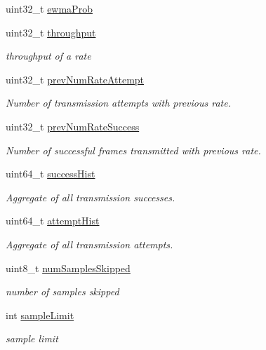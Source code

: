 \begin{DoxyCompactItemize}
uint32\+\_\+t \hyperlink{structns3_1_1RateInfo_a10c85a572d1d7abd171f4c3f377b6262}{ewma\+Prob}
\item 
uint32\+\_\+t \hyperlink{structns3_1_1RateInfo_acd9afc412f2d9c5573eb9bc3a00412b5}{throughput}
\begin{DoxyCompactList}\small\item\em throughput of a rate \end{DoxyCompactList}\item 
uint32\+\_\+t \hyperlink{structns3_1_1RateInfo_ad8211951a43c7f171155f54ec34d05e0}{prev\+Num\+Rate\+Attempt}
\begin{DoxyCompactList}\small\item\em Number of transmission attempts with previous rate. \end{DoxyCompactList}\item 
uint32\+\_\+t \hyperlink{structns3_1_1RateInfo_a76afd4eb7f46ff410b42f2b67d3afefc}{prev\+Num\+Rate\+Success}
\begin{DoxyCompactList}\small\item\em Number of successful frames transmitted with previous rate. \end{DoxyCompactList}\item 
uint64\+\_\+t \hyperlink{structns3_1_1RateInfo_ac5b5bd34d0f4f11dd0a82210bb15005f}{success\+Hist}
\begin{DoxyCompactList}\small\item\em Aggregate of all transmission successes. \end{DoxyCompactList}\item 
uint64\+\_\+t \hyperlink{structns3_1_1RateInfo_afabcdb30c89c23c38385f80057486f9a}{attempt\+Hist}
\begin{DoxyCompactList}\small\item\em Aggregate of all transmission attempts. \end{DoxyCompactList}\item 
uint8\+\_\+t \hyperlink{structns3_1_1RateInfo_a0f6575fc7210a909c7608ea5d837d41b}{num\+Samples\+Skipped}
\begin{DoxyCompactList}\small\item\em number of samples skipped \end{DoxyCompactList}\item 
int \hyperlink{structns3_1_1RateInfo_a97037d11aa3723b04bf3f319a398de2f}{sample\+Limit}
\begin{DoxyCompactList}\small\item\em sample limit \end{DoxyCompactList}\end{DoxyCompactItemize}


